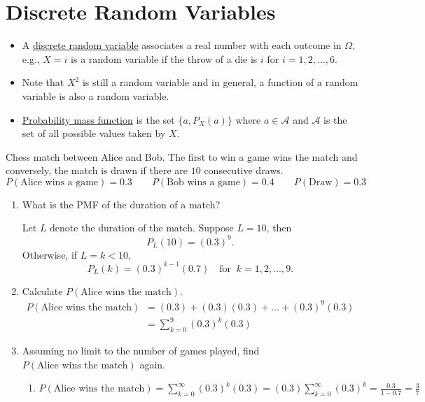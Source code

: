 \section{Discrete Random Variables}
\begin{itemize}
  \item A \underline{discrete random variable} associates a real number
    with each outcome in $\Omega$, e.g., $X = i$ is a random variable
    if the throw of a die is $i$ for $i = 1,2,\ldots,6$.
  \item Note that $X^2$ is still a random variable and in general,
    a function of a random variable is also a random variable.
  \item \underline{Probability mass function} is the set
    $\{a, P_X(a)\}$ where $a \in \mathcal{A}$ and $\mathcal{A}$ is the
    set of all possible values taken by $X$.
\end{itemize}
\begin{example}
  Chess match between Alice and Bob. The first to win a game wins the
  match and conversely, the match is drawn if there are $10$ consecutive
  draws.
  \begin{equation*}
    P(\text{Alice wins a game}) = 0.3 \qquad
    P(\text{Bob wins a game}) = 0.4 \qquad
    P(\text{Draw}) = 0.3
  \end{equation*}
  \begin{enumerate}
    \item What is the PMF of the duration of a match?

      Let $L$ denote the duration of the match. Suppose $L=10$, then
      \begin{equation*}
        P_L(10) = (0.3)^9
        .
      \end{equation*}
      Otherwise, if $L = k < 10$,
      \begin{equation*}
        P_L(k) = (0.3)^{k-1} (0.7) \quad \text{for }\ k=1,2,\ldots,9
        .
      \end{equation*}
    \item Calculate $P(\text{Alice wins the match})$.
      \begin{align*}
        P(\text{Alice wins the match}) &= (0.3) + (0.3)(0.3) + \ldots
        + (0.3)^9(0.3) \\
        &= \sum_{k=0}^{9} (0.3)^k(0.3)
      \end{align*}
    \item Assuming no limit to the number of games played, find
      $P(\text{Alice wins the match})$ again.
      \begin{enumerate}
        \item $P(\text{Alice wins the match}) = \sum_{k=0}^{\infty} (0.3)^k(0.3) = (0.3) \sum_{k=0}^{\infty} (0.3)^k = \frac{0.3}{1-0.7} = \frac{3}{7}$
      \end{enumerate}
  \end{enumerate}
\end{example}
